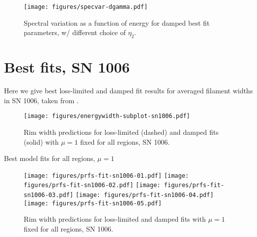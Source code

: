 \documentclass[iop, apj, numberedappendix]{emulateapj}
\begin{document}
\begin{figure*}
    \centering
    \texttt{[image: figures/specvar-dgamma.pdf]}
    \caption{Spectral variation as a function of energy for damped best fit
    parameters, w/ different choice of $\eta_2$.}
\end{figure*}



\clearpage
\section{Best fits, SN 1006}

Here we give best loss-limited and damped fit results for averaged filament
widths in SN 1006, taken from \citet{ressler2014}.

\begin{figure*}[h]
    \centering
    \texttt{[image: figures/energywidth-subplot-sn1006.pdf]}
    \caption{Rim width predictions for loss-limited (dashed) and damped fits
        (solid) with $\mu = 1$ fixed for all regions, SN 1006.}
\end{figure*}

\begin{table}[h]
    \footnotesize
    \centering
    \caption{Best model fits for all regions, $\mu = 1$}
    
\end{table}

\begin{figure*}[h]
    \centering
    \texttt{[image: figures/prfs-fit-sn1006-01.pdf]}
    \texttt{[image: figures/prfs-fit-sn1006-02.pdf]}
    \texttt{[image: figures/prfs-fit-sn1006-03.pdf]}
    \texttt{[image: figures/prfs-fit-sn1006-04.pdf]}
    \texttt{[image: figures/prfs-fit-sn1006-05.pdf]}
    \caption{Rim width predictions for loss-limited and damped fits with
    $\mu = 1$ fixed for all regions, SN 1006.}
\end{figure*}
\end{document}
